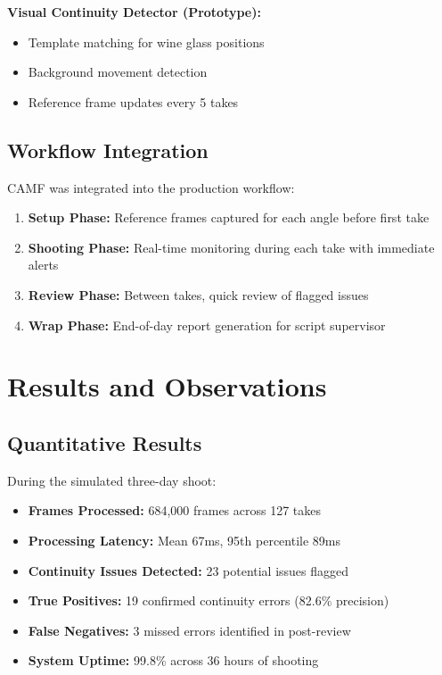 \textbf{Visual Continuity Detector (Prototype):}
\begin{itemize}
\item Template matching for wine glass positions
\item Background movement detection
\item Reference frame updates every 5 takes
\end{itemize}

\subsection{Workflow Integration}
\label{subsec:workflow}

CAMF was integrated into the production workflow:

\begin{enumerate}
\item \textbf{Setup Phase:} Reference frames captured for each angle before first take
\item \textbf{Shooting Phase:} Real-time monitoring during each take with immediate alerts
\item \textbf{Review Phase:} Between takes, quick review of flagged issues
\item \textbf{Wrap Phase:} End-of-day report generation for script supervisor
\end{enumerate}

\section{Results and Observations}
\label{sec:case-results}

\subsection{Quantitative Results}
\label{subsec:quant-results}

During the simulated three-day shoot:

\begin{itemize}
\item \textbf{Frames Processed:} 684,000 frames across 127 takes
\item \textbf{Processing Latency:} Mean 67ms, 95th percentile 89ms
\item \textbf{Continuity Issues Detected:} 23 potential issues flagged
\item \textbf{True Positives:} 19 confirmed continuity errors (82.6\% precision)
\item \textbf{False Negatives:} 3 missed errors identified in post-review
\item \textbf{System Uptime:} 99.8\% across 36 hours of shooting
\end{itemize}

